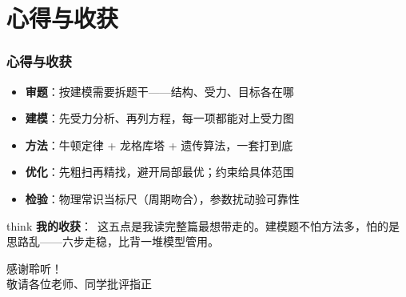 \documentclass[aspectratio=169]{beamer}
\newcommand{\remark}[2]{%
	\vspace{0.12cm}%
	\begin{beamercolorbox}[rounded=true,sep=6pt]{think}%
		{\color{orchidpurple}\textbf{#1}：}~#2%
	\end{beamercolorbox}%
}
\begin{document}
\section{心得与收获}
\begin{frame}
	\frametitle{心得与收获}
	\scriptsize
	\begin{itemize}
		\item \textbf{审题}：按建模需要拆题干——结构、受力、目标各在哪
		\item \textbf{建模}：先受力分析、再列方程，每一项都能对上受力图
		\item \textbf{方法}：牛顿定律 + 龙格库塔 + 遗传算法，一套打到底
		\item \textbf{优化}：先粗扫再精找，避开局部最优；约束给具体范围
		\item \textbf{检验}：物理常识当标尺（周期吻合），参数扰动验可靠性
	\end{itemize}
	\remark{我的收获}{这五点是我读完整篇最想带走的。建模题不怕方法多，怕的是思路乱——六步走稳，比背一堆模型管用。}
\end{frame}

\begin{frame}
	\centering
	\Huge{感谢聆听！}\\[1cm]
	\Large{敬请各位老师、同学批评指正}
\end{frame}
\end{document}
